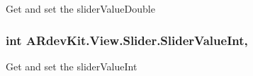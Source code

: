 Get and set the slider\-Value\-Double 

\hypertarget{class_a_rdev_kit_1_1_view_1_1_slider_a3405af3a2d8c39d5e018899859768da5}{
\subsubsection[{Slider\-Value\-Int}]{\setlength{\rightskip}{0pt plus 5cm}int A\-Rdev\-Kit.\-View.\-Slider.\-Slider\-Value\-Int\hspace{0.3cm}{\ttfamily [get]}, {\ttfamily [set]}}}\label{class_a_rdev_kit_1_1_view_1_1_slider_a3405af3a2d8c39d5e018899859768da5}


Get and set the slider\-Value\-Int 

